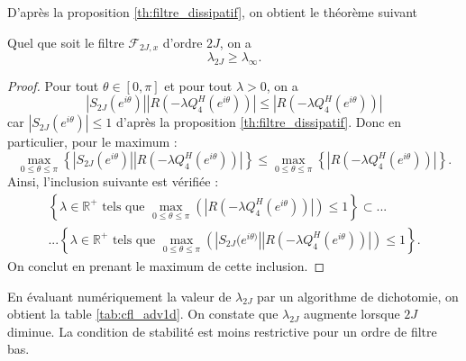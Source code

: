 D'après la proposition \ref{th:filtre_dissipatif}, on obtient le théorème suivant
\begin{theoreme}
Quel que soit le filtre $\mathcal{F}_{2J,x}$ d'ordre $2J$, on a 
\begin{equation}
\lambda_{2J} \geq \lambda_{\infty}.
\end{equation}
\end{theoreme}

\begin{proof}
Pour tout $\theta \in [0,\pi]$ et pour tout $\lambda >0$, on a 
\begin{equation}
|S_{2J}(e^{i \theta})||R(-\lambda Q_4^H(e^{i \theta}))| \leq  |R(-\lambda Q_4^H(e^{i \theta}))|
\end{equation}
car $|S_{2J}(e^{i \theta})| \leq 1$ d'après la proposition \ref{th:filtre_dissipatif}. Donc en particulier, pour le maximum :
\begin{equation}
\max_{0\leq \theta \leq \pi} \left\lbrace |S_{2J}(e^{i \theta})||R(-\lambda Q_4^H(e^{i \theta}))| \right\rbrace \leq  \max_{0\leq \theta \leq \pi} \left\lbrace|R(-\lambda Q_4^H(e^{i \theta}))|\right\rbrace.
\end{equation}
Ainsi, l'inclusion suivante est vérifiée :
\begin{multline}
\left\lbrace \lambda \in \mathbb{R}^+ \text{ tels que } \max_{0 \leq \theta \leq \pi} \left( |R(-\lambda Q_4^H (e^{i \theta}))| \right) \leq 1 \right\rbrace \subset ...\\
...
\left\lbrace \lambda \in \mathbb{R}^+ \text{ tels que } \max_{0 \leq \theta \leq \pi} \left( |S_{2J}(e^{i \theta)}||R(-\lambda Q_4^H (e^{i \theta}))| \right) \leq 1 \right\rbrace.
\end{multline}
On conclut en prenant le maximum de cette inclusion.
\end{proof}

En évaluant numériquement la valeur de $\lambda_{2J}$ par un algorithme de dichotomie, on obtient la table \ref{tab:cfl_adv1d}. On constate que $\lambda_{2J}$ augmente lorsque $2J$ diminue. La condition de stabilité est moins restrictive pour un ordre de filtre bas.

